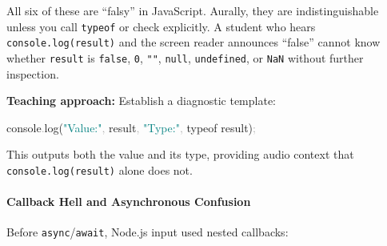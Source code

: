 \documentclass[
  justified,
  openright,
]{tufte-book}
\let\subsubsection\paragraph
\let\paragraph\paragraph
\newcommand{\BuiltInTok}[1]{#1}
\newcommand{\CommentTok}[1]{\textcolor{MidGray}{#1}}
\newcommand{\FunctionTok}[1]{\textcolor{BrandBlue}{#1}}
\newcommand{\KeywordTok}[1]{\textcolor{BrandBlue}{#1}}
\newcommand{\NormalTok}[1]{#1}
\newcommand{\OperatorTok}[1]{\textcolor{DarkGray}{#1}}
\newcommand{\SpecialCharTok}[1]{\textcolor{Teal}{#1}}
\newcommand{\StringTok}[1]{\textcolor{Teal}{#1}}
\newcommand{\VerbatimStringTok}[1]{\textcolor{Teal}{#1}}
\newenvironment{Shaded}{%
  \begin{snugshade}
}{%
  \end{snugshade}
}
\let\subsubsection\paragraph
\let\paragraph\paragraph
\begin{document}
All six of these are ``falsy'' in JavaScript. Aurally, they are
indistinguishable unless you call \texttt{typeof} or check explicitly. A
student who hears \texttt{console.log(result)} and the screen reader
announces ``false'' cannot know whether \texttt{result} is
\texttt{false}, \texttt{0}, \texttt{""}, \texttt{null},
\texttt{undefined}, or \texttt{NaN} without further inspection.

\textbf{Teaching approach:} Establish a diagnostic template:

\begin{Shaded}
\begin{Highlighting}[]
\BuiltInTok{console}\OperatorTok{.}\FunctionTok{log}\NormalTok{(}\StringTok{"Value:"}\OperatorTok{,}\NormalTok{ result}\OperatorTok{,} \StringTok{"Type:"}\OperatorTok{,} \KeywordTok{typeof}\NormalTok{ result)}\OperatorTok{;}
\end{Highlighting}
\end{Shaded}

This outputs both the value and its type, providing audio context that
\texttt{console.log(result)} alone does not.

\subsubsection{Callback Hell and Asynchronous
Confusion}\label{callback-hell-and-asynchronous-confusion}

Before \texttt{async}/\texttt{await}, Node.js input used nested
callbacks:

\begin{Shaded}
\end{Shaded}
\end{document}
